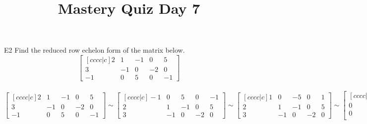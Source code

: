 \documentclass{sbgLAquiz}
\title{Mastery Quiz Day 7 }
\begin{document}
\begin{problem}{E2}
Find the reduced row echelon form of the matrix below.
$$\begin{bmatrix}[cccc|c] 2 & 1 & -1 & 0 & 5 \\ 3 & -1 & 0 & -2 & 0 \\ -1 & 0 & 5 & 0 & -1 \end{bmatrix}$$
\end{problem}
\begin{solution}
$$\begin{bmatrix}[cccc|c]
 2 & 1 & -1 & 0 & 5 \\
 3 & -1 & 0 & -2 & 0 \\
 -1 & 0 & 5 & 0 & -1
\end{bmatrix} \sim
\begin{bmatrix}[cccc|c]
 -1 & 0 & 5 & 0 & -1  \\
 2 & 1 & -1 & 0 & 5 \\
 3 & -1 & 0 & -2 & 0
\end{bmatrix} \sim
\begin{bmatrix}[cccc|c]
 1 & 0 & -5 & 0 & 1 \\
 2 & 1 & -1 & 0 & 5 \\
 3 & -1 & 0 & -2 & 0
\end{bmatrix} \sim
\begin{bmatrix}[cccc|c]
 1 & 0 & -5 & 0 & 1  \\
 0 & 1 & 9 & 0 & 3 \\
 0 & -1 & 15 & -2 & -3 \\
\end{bmatrix} \sim
\begin{bmatrix}[cccc|c]
 1 & 0 & -5 & 0 & 1  \\
 0 & 1 & 9 & 0 & 3 \\
 0 & 0 & 24 & -2 & 0 \\
\end{bmatrix} \sim
\begin{bmatrix}[cccc|c]
 1 & 0 & -5 & 0 & 1 \\
 0 & 1 & 9 & 0 & 3 \\
 0 & 0 & 1 & -\frac{1}{12} & 0 \\
\end{bmatrix} \sim
\begin{bmatrix}[cccc|c]
1 & 0 & 0 & -\frac{5}{12} & 1 \\
 0 & 1 & 0 & \frac{3}{4} & 3 \\
 0 & 0 & 1 & -\frac{1}{12} & 0
\end{bmatrix}$$
\end{solution}
\end{document}
